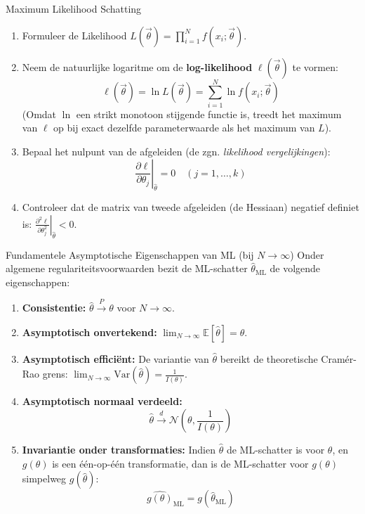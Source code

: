 \documentclass[11pt,a4paper]{article}
\newcommand{\E}{\mathbb{E}}
\newcommand{\Var}{\text{Var}}
\newcommand{\normdist}{\mathcal{N}}
\begin{document}
\begin{stappenplan}{Maximum Likelihood Schatting}
\begin{enumerate}[leftmargin=1.2em]
    \item Formuleer de Likelihood $L(\vec{\theta}) = \prod_{i=1}^N f(x_i; \vec{\theta})$.
    \item Neem de natuurlijke logaritme om de \textbf{log-likelihood} $\ell(\vec{\theta})$ te vormen:
    \begin{equation}
        \ell(\vec{\theta}) = \ln L(\vec{\theta}) = \sum_{i=1}^N \ln f(x_i; \vec{\theta})
    \end{equation}
    (Omdat $\ln$ een strikt monotoon stijgende functie is, treedt het maximum van $\ell$ op bij exact dezelfde parameterwaarde als het maximum van $L$).
    \item Bepaal het nulpunt van de afgeleiden (de zgn. \emph{likelihood vergelijkingen}):
    \begin{equation}
        \left. \frac{\partial \ell}{\partial \theta_j} \right|_{\hat{\theta}} = 0 \quad (j = 1, \ldots, k)
    \end{equation}
    \item Controleer dat de matrix van tweede afgeleiden (de Hessiaan) negatief definiet is: $\left. \frac{\partial^2 \ell}{\partial \theta_j^2} \right|_{\hat{\theta}} < 0$.
\end{enumerate}
\end{stappenplan}

\begin{theobox}{Fundamentele Asymptotische Eigenschappen van ML (bij $N \to \infty$)}
Onder algemene regulariteitsvoorwaarden bezit de ML-schatter $\hat{\theta}_{\text{ML}}$ de volgende eigenschappen:
\begin{enumerate}[leftmargin=1.2em]
    \item \textbf{Consistentie:} $\hat{\theta} \xrightarrow{P} \theta$ voor $N \to \infty$.
    \item \textbf{Asymptotisch onvertekend:} $\lim_{N \to \infty} \E[\hat{\theta}] = \theta$.
    \item \textbf{Asymptotisch efficiënt:} De variantie van $\hat{\theta}$ bereikt de theoretische Cramér-Rao grens: $\lim_{N \to \infty} \Var(\hat{\theta}) = \frac{1}{I(\theta)}$.
    \item \textbf{Asymptotisch normaal verdeeld:}
    \begin{equation}
        \hat{\theta} \xrightarrow{d} \normdist\left( \theta, \frac{1}{I(\theta)} \right)
    \end{equation}
    \item \textbf{Invariantie onder transformaties:} Indien $\hat{\theta}$ de ML-schatter is voor $\theta$, en $g(\theta)$ is een één-op-één transformatie, dan is de ML-schatter voor $g(\theta)$ simpelweg $g(\hat{\theta})$:
    \begin{equation}
        \widehat{g(\theta)}_{\text{ML}} = g(\hat{\theta}_{\text{ML}})
    \end{equation}
\end{enumerate}
\end{theobox}
\end{document}
